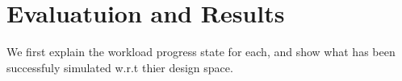 \section{Evaluatuion and Results} \label{sec:eval}

We first explain the workload progress state for each, and 
show what has been successfuly simulated w.r.t thier design space. 




